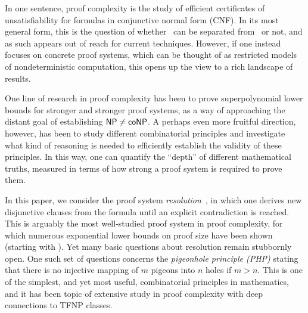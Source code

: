 \documentclass{article}
\newcommand{\complclassformat}[1]{\textrm{\upshape{\textsf{#1}}}\xspace}
\newcommand{\cocomplclass}[1]{\textrm{\upshape{\textsf{co#1}}}\xspace}
\newcommand{\NP}{\complclassformat{NP}}
\newcommand{\coNP}{\cocomplclass{NP}}
\newcommand{\introduceterm}[1]{{\emph{#1}}}
\numberwithin{equation}{section}
\begin{document}
In one sentence, 
proof complexity 
is the study
of efficient certificates of unsatisfiability for formulas in
conjunctive normal form (CNF).  In its most general form, this is the
question of whether \coNP~can be separated from \NP~or not, and as
such appears out of reach for current techniques. 
However, if one instead focuses on concrete proof systems, which can
be thought of as restricted models of nondeterministic computation,
this opens up the view to a rich landscape of results.

One line of research in proof complexity has been to prove
superpolynomial lower bounds for stronger and stronger proof systems,
as a way of approaching 
the distant goal of establishing
$\NP \neq \coNP$. 
A perhaps even more fruitful direction, however, has been to study
different combinatorial principles and investigate what kind of
reasoning is needed to efficiently establish the validity of these
principles.  In this way, one can quantify the ``depth'' of
different mathematical truths, measured in terms of how strong a proof
system is required to prove them.

In this paper, we consider the proof system
\introduceterm{resolution}~\cite{Blake37Thesis}, in which one derives
new disjunctive clauses 
from the
formula until an
explicit contradiction is reached.
This is arguably the most well-studied proof system
in proof complexity, for which numerous exponential lower
bounds on proof size have been shown (starting with
\cite{CS88ManyHard,Haken85Intractability,Urquhart87HardExamples}).
Yet many basic questions about resolution remain stubbornly open.
One such set of questions concerns the
\introduceterm{pigeonhole principle (PHP)}
stating that there is no injective mapping of $m$ pigeons into $n$
holes if $m > n$.  This is one of the simplest, 
and yet most useful, combinatorial principles in mathematics, and it
has been topic of extensive study in proof complexity with deep
connections to TFNP classes.
\end{document}
